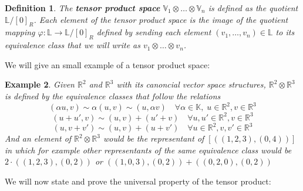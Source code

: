 \documentclass[11pt,a4paper,openright,oneside]{book}
\numberwithin{equation}{section}
\newtheorem{defn0}{Definition}[chapter]
\newtheorem{example0}[defn0]{Example}
\newenvironment{definition}{ \begin{defn0}}{\end{defn0}}
\newenvironment{example}{ \begin{example0}\rm}{\end{example0}}
\begin{document}
\begin{definition} 
    The \textbf{tensor product space} $\mathbb{V}_1 \otimes \dots \otimes \mathbb{V}_n$ is defined as the quotient $\mathbb{L} / [0]_R$. 
    Each element of the tensor product space is the image of the quotient mapping ${\varphi: \mathbb{L} \rightarrow \mathbb{L} / [0]_R}$
    defined by sending each element $(v_1, \dots, v_n) \in \mathbb{L}$ to its equivalence class that we
    will write as $v_1 \otimes \dots \otimes v_n$. 
\end{definition}

We will give an small example of a tensor product space:

\begin{example}
    Given $\mathbb{R}^2$ and $\mathbb{R}^3$ with its canoncial vector space
    structures, $\mathbb{R}^2 \otimes \mathbb{R}^3$ is defined by the equivalence classes that follow the relations
    $$(\alpha u, v) \sim \alpha (u, v) \sim (u, \alpha v) \quad \forall \alpha \in \mathbb{K}, \; u \in \mathbb{R}^2, v \in \mathbb{R}^3$$
    $$(u + u', v) \sim (u, v) + (u' + v) \quad \forall u, u' \in \mathbb{R}^2, v \in \mathbb{R}^3$$
    $$(u, v + v') \sim (u, v) + (u + v') \quad \forall u \in \mathbb{R}^2, v, v' \in \mathbb{R}^3$$
    And an element of $\mathbb{R}^2 \otimes \mathbb{R}^3$ would be the representant of $[((1, 2, 3), (0, 4))]$ in which
    for example other representants of the same equivalence class would be $2 \cdot ((1,2,3), (0, 2))$ or ${((1, 0, 3), (0, 2)) + ((0,2,0), (0, 2))}$
\end{example}


We will now state and prove the universal property of the tensor product:
\end{document}
